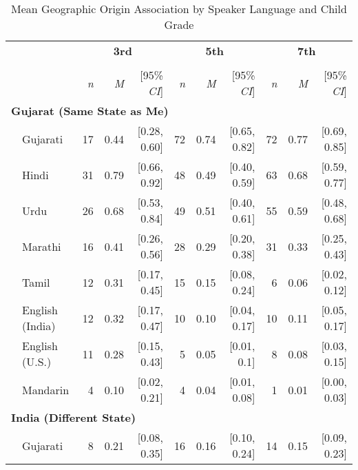 \begin{table}[t]
 \centering
\caption{Mean Geographic Origin Association by Speaker Language and Child Grade}
\begin{footnotesize}
\renewcommand{\tabcolsep}{0.15cm}
\label{tab:geographic-origins-means}
\begin{tabular}{p{.1in}lrrrrrrrrr}
\toprule
 &  & \multicolumn{3}{c}{\textbf{3rd}} & \multicolumn{3}{c}{\textbf{5th}} & \multicolumn{3}{c}{\textbf{7th}} \\
\cline{3-5} \cline{6-8} \cline{9-11}\\[-.75em]
&  & \textit{n} & \textit{M} & [95\% \textit{CI}] &  \textit{n} & \textit{M} & [95\% \textit{CI}] &  \textit{n}  & \textit{M} & [95\% \textit{CI}]\\
\midrule
\multicolumn{11}{l}{\textbf{Gujarat (Same State as Me)}}\\
 & Gujarati & 17 & 0.44 & [0.28, 0.60] & 72 & 0.74 & [0.65, 0.82] & 72 & 0.77 & [0.69, 0.85]\\

 & Hindi & 31 & 0.79 & [0.66, 0.92] & 48 & 0.49 & [0.40, 0.59] & 63 & 0.68 & [0.59, 0.77]\\

 & Urdu & 26 & 0.68 & [0.53, 0.84] & 49 & 0.51 & [0.40, 0.61] & 55 & 0.59 & [0.48, 0.68]\\

 & Marathi & 16 & 0.41 & [0.26, 0.56] & 28 & 0.29 & [0.20, 0.38] & 31 & 0.33 & [0.25, 0.43]\\

 & Tamil & 12 & 0.31 & [0.17, 0.45] & 15 & 0.15 & [0.08, 0.24] & 6 & 0.06 & [0.02, 0.12]\\

 & English (India) & 12 & 0.32 & [0.17, 0.47] & 10 & 0.10 & [0.04, 0.17] & 10 & 0.11 & [0.05, 0.17]\\

 & English (U.S.) & 11 & 0.28 & [0.15, 0.43] & 5 & 0.05 & [0.01, 0.1] & 8 & 0.08 & [0.03, 0.15]\\

& Mandarin & 4 & 0.10 & [0.02, 0.21] & 4 & 0.04 & [0.01, 0.08] & 1 & 0.01 & [0.00, 0.03]\\

\midrule
\multicolumn{11}{l}{\textbf{India (Different State)}}\\
  & Gujarati & 8 & 0.21 & [0.08, 0.35] & 16 & 0.16 & [0.10, 0.24] & 14 & 0.15 & [0.09, 0.23]\\


\end{tabular}
\end{footnotesize}
\end{table}
